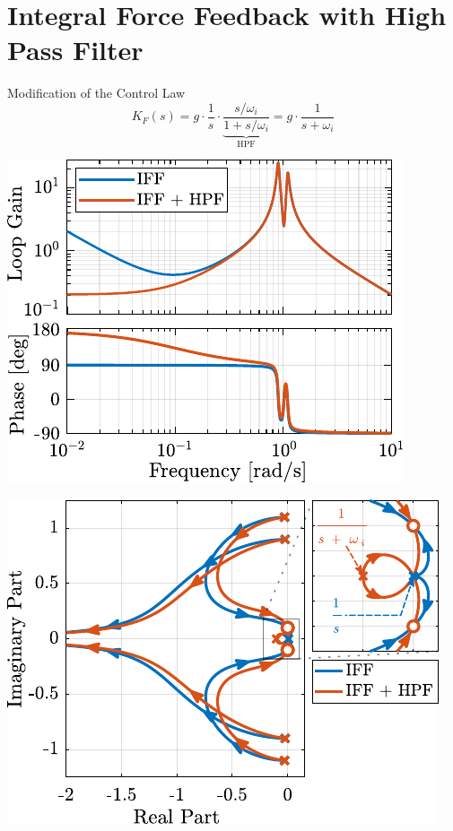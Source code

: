 \documentclass[t, minted]{clean-beamer}
\begin{document}
\section{Integral Force Feedback with High Pass Filter}
\label{sec:org789619d}
\begin{frame}[label={sec:org2020343}]{Modification of the Control Law}
\begin{equation*}
  K_{F}(s) = g \cdot \frac{1}{s} \cdot \underbrace{\frac{s/\omega_i}{1 + s/\omega_i}}_{\text{HPF}} = g \cdot \frac{1}{s + \omega_i}
\end{equation*}

\vspace{1em}

\begin{minipage}[b]{0.45\linewidth}
\begin{center}
\includegraphics[width=\linewidth]{figs/loop_gain_modified_iff.pdf}
\end{center}
\end{minipage}
\hfill
\begin{minipage}[b]{0.5\linewidth}
\begin{center}
\includegraphics[width=\linewidth]{figs/root_locus_modified_iff.pdf}

\end{center}
\end{minipage}
\end{frame}
\end{document}
